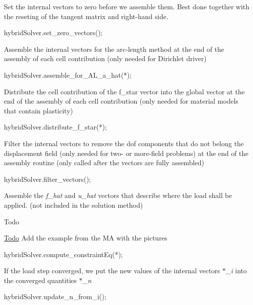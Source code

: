 \begin{DoxyItemize}
\item Set the internal vectors to zero before we assemble them. Best done together with the reseting of the tangent matrix and right-\/hand side. 
\begin{DoxyCode}
hybridSolver.set\_zero\_vectors();
\end{DoxyCode}

\item Assemble the internal vectors for the arc-\/length method at the end of the assembly of each cell contribution (only needed for Dirichlet driver) 
\begin{DoxyCode}
hybridSolver.assemble\_for\_AL\_a\_hat(*);
\end{DoxyCode}

\item Distribute the cell contribution of the f\+\_\+star vector into the global vector at the end of the assembly of each cell contribution (only needed for material models that contain plasticity) 
\begin{DoxyCode}
hybridSolver.distribute\_f\_star(*);
\end{DoxyCode}

\item Filter the internal vectors to remove the dof components that do not belong the displacement field (only needed for two-\/ or more-\/field problems) at the end of the assembly routine (only called after the vectors are fully assembled) 
\begin{DoxyCode}
hybridSolver.filter\_vectors();
\end{DoxyCode}

\item Assemble the {\itshape f\+\_\+hat} and {\itshape u\+\_\+hat} vectors that describe where the load shall be applied. (not included in the solution method) \begin{DoxyRefDesc}{Todo}
\item[\hyperlink{todo__todo000003}{Todo}]Add the example from the MA with the pictures\end{DoxyRefDesc}

\begin{DoxyCode}
hybridSolver.compute\_constraintEq(*);
\end{DoxyCode}

\item If the load step converged, we put the new values of the internal vectors {\itshape $\ast$\+\_\+i} into the converged quantities {\itshape $\ast$\+\_\+n} 
\begin{DoxyCode}
hybridSolver.update\_n\_from\_i();
\end{DoxyCode}


\end{DoxyItemize}
